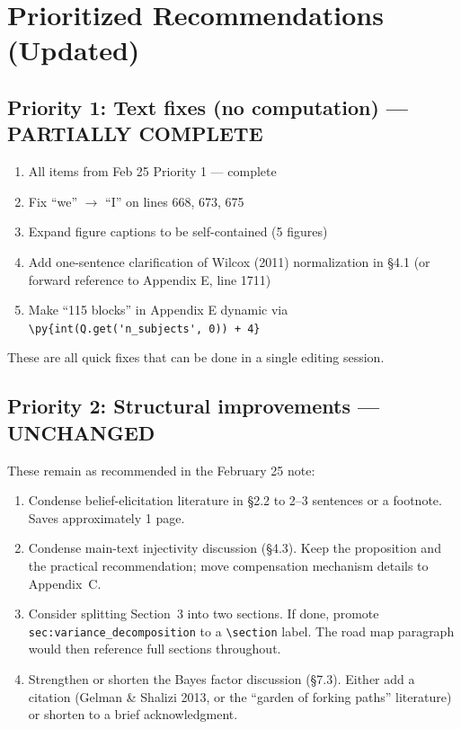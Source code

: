 \documentclass[12pt,a4paper]{article}
\begin{document}
\section{Prioritized Recommendations (Updated)}

\subsection{Priority 1: Text fixes (no computation) --- PARTIALLY COMPLETE}

\begin{enumerate}
  \item[{[x]}] All items from Feb 25 Priority 1 --- complete
  \item[{[ ]}] Fix ``we'' $\to$ ``I'' on lines 668, 673, 675
  \item[{[ ]}] Expand figure captions to be self-contained (5 figures)
  \item[{[ ]}] Add one-sentence clarification of Wilcox (2011) normalization
    in \S4.1 (or forward reference to Appendix E, line 1711)
  \item[{[ ]}] Make ``115 blocks'' in Appendix E dynamic via
    \verb|\py{int(Q.get('n_subjects', 0)) + 4}|
\end{enumerate}

These are all quick fixes that can be done in a single editing session.


\subsection{Priority 2: Structural improvements --- UNCHANGED}

These remain as recommended in the February 25 note:

\begin{enumerate}[label=(\alph*)]
  \item Condense belief-elicitation literature in \S2.2 to 2--3 sentences or a
    footnote. Saves approximately 1 page.
  \item Condense main-text injectivity discussion (\S4.3). Keep the
    proposition and the practical recommendation; move compensation mechanism
    details to Appendix~C.
  \item Consider splitting Section~3 into two sections. If done, promote
    \verb|sec:variance_decomposition| to a \verb|\section| label. The road map
    paragraph would then reference full sections throughout.
  \item Strengthen or shorten the Bayes factor discussion (\S7.3). Either add
    a citation (Gelman \& Shalizi 2013, or the ``garden of forking paths''
    literature) or shorten to a brief acknowledgment.
\end{enumerate}
\end{document}
